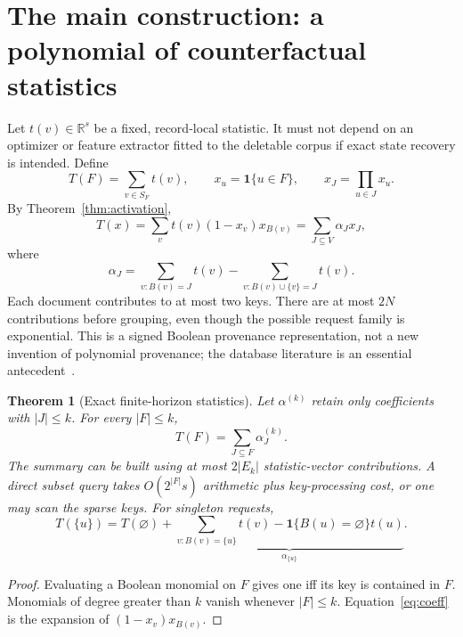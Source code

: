\documentclass[11pt,a4paper]{article}
\newtheorem{theorem}{Theorem}[section]
\theoremstyle{definition}\newtheorem{definition}[theorem]{Definition}
\newcommand{\R}{\mathbb R}\newcommand{\E}{\mathbb E}\newcommand{\1}{\mathbf 1}
\begin{document}
\section{The main construction: a polynomial of counterfactual statistics}\label{sec:polynomial}
Let $t(v)\in\R^s$ be a fixed, record-local statistic. It must not depend on an optimizer or feature extractor fitted to the deletable corpus if exact state recovery is intended. Define
\[
 T(F)=\sum_{v\in S_F}t(v),\qquad x_u=\1\{u\in F\},\qquad x_J=\prod_{u\in J}x_u.
\]
By Theorem~\ref{thm:activation},
\begin{equation}\label{eq:poly}
 T(x)=\sum_v t(v)(1-x_v)x_{B(v)}
      =\sum_{J\subseteq V}\alpha_J x_J,
\end{equation}
where
\begin{equation}\label{eq:coeff}
 \alpha_J=\sum_{v:B(v)=J}t(v)
          -\sum_{v:B(v)\cup\{v\}=J}t(v).
\end{equation}
Each document contributes to at most two keys. There are at most $2N$ contributions before grouping, even though the possible request family is exponential. This is a signed Boolean provenance representation, not a new invention of polynomial provenance; the database literature is an essential antecedent~\cite{green2007,amsterdamer2011}.

\begin{theorem}[Exact finite-horizon statistics]\label{thm:poly}
Let $\alpha^{(k)}$ retain only coefficients with $|J|\le k$. For every $|F|\le k$,
\begin{equation}\label{eq:query}
 T(F)=\sum_{J\subseteq F}\alpha^{(k)}_J.
\end{equation}
The summary can be built using at most $2|E_k|$ statistic-vector contributions. A direct subset query takes $O(2^{|F|}s)$ arithmetic plus key-processing cost, or one may scan the sparse keys. For singleton requests,
\[
 T(\{u\})=T(\varnothing)+
 \underbrace{\sum_{v:B(v)=\{u\}}t(v)-\1\{B(u)=\varnothing\}t(u)}_{\alpha_{\{u\}}}.
\]
\end{theorem}
\begin{proof}
Evaluating a Boolean monomial on $F$ gives one iff its key is contained in $F$. Monomials of degree greater than $k$ vanish whenever $|F|\le k$. Equation~\eqref{eq:coeff} is the expansion of $(1-x_v)x_{B(v)}$.
\end{proof}
\end{document}
